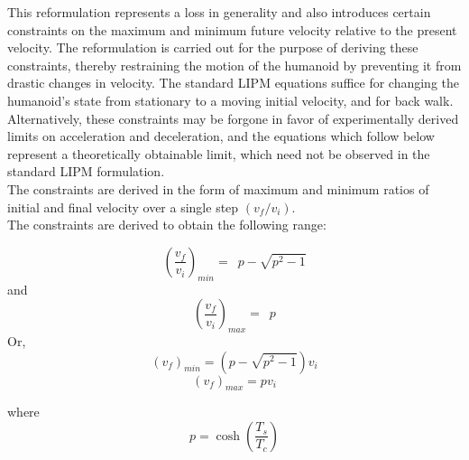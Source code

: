 \documentclass[letterpaper, 10 pt, conference]{ieeeconf}  %
\begin{document}
 This reformulation represents a loss in generality and also introduces
 certain constraints on the maximum and minimum future velocity relative to
 the present velocity. The reformulation is carried out for the purpose of deriving these constraints,
thereby restraining the motion of the humanoid by preventing it from drastic changes in velocity. The standard LIPM equations suffice for changing the humanoid's state from stationary to a moving
initial velocity, and for back walk. Alternatively, these constraints may be forgone in favor of experimentally derived limits on acceleration and deceleration, and the equations which follow below 
represent a theoretically obtainable limit, which need not be observed in the standard LIPM formulation.
\\
The constraints are derived in
 the form of maximum and minimum ratios of initial and final velocity over a single step $\left(v_{f}/v_{i}\right)$.\\
 The constraints are derived to obtain the following range:

 \begin{equation}
 \left(\frac{v_f}{v_i}\right)_{min} =\enspace p - \sqrt{p^2 - 1}
 \end{equation}
 and
 \begin{equation}
 \left(\frac{v_f}{v_i}\right)_{max}=\enspace p
 \end{equation}
 Or,
 \begin{equation}
(v_f)_{min}	    = \left(p - \sqrt{p^2 - 1}\right)v_i
 \end{equation}
 \begin{equation}
 (v_f)_{max}=pv_i
  \end{equation}

  where \begin{equation}
 p=\cosh\left(\frac{T_s}{T_c}\right)
 \end{equation}
 
\end{document}
